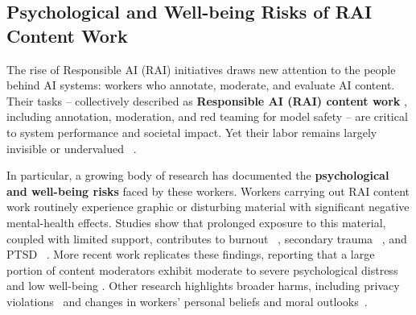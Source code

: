 \subsection{Psychological and Well-being Risks of RAI Content Work} 
The rise of Responsible AI (RAI) initiatives draws new attention to the people behind AI systems: workers who annotate, moderate, and evaluate AI content. Their tasks -- collectively described as \textbf{Responsible AI (RAI) content work} \cite{qian2025aura}, including annotation, moderation, and red teaming for model safety -- are critical to system performance and societal impact. Yet their labor remains largely invisible or undervalued ~\cite{gray2019ghost}. 

In particular, a growing body of research has documented the \textbf{psychological and well-being risks} faced by these workers. Workers carrying out RAI content work routinely experience graphic or disturbing material with significant negative mental-health effects. Studies show that prolonged exposure to this material, coupled with limited support, contributes to burnout ~\cite{dosono2019moderation}, secondary trauma ~\cite{martinez2024secondary}, and PTSD ~\cite{steiger_psychological_2021, alemadi2024emotional, Michel2018ExContentMS, ruckenstein_re-humanizing_2020, Dwoskin_2019, arsht_2018_human}. More recent work replicates these findings, reporting that a large portion of content moderators exhibit moderate to severe psychological distress and low well-being \cite{Spence2025ContentModeratorMentalHealth}. Other research highlights broader harms, including privacy violations~\cite{pinchevski2023social, schopke-gonzalez_why_2022} and changes in workers’ personal beliefs and moral outlooks~\cite{newton_trauma_2019, Stackpole_2022, Douek_2021}.

